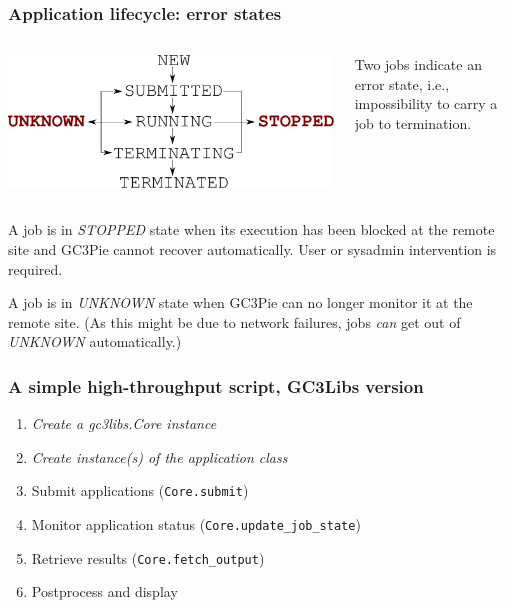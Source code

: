 \documentclass[english,serif,mathserif,xcolor=pdftex,dvipsnames,table]{beamer}
\begin{document}
\begin{frame}[fragile]
\frametitle{Application lifecycle: error states}
\begin{columns}[c]
  \begin{column}{0.5\textwidth}
    \includegraphics[width=\textwidth]{fig/states-error}
  \end{column}
  \begin{column}{0.5\textwidth}
    \raggedleft

    Two jobs indicate an error state, i.e., impossibility to carry a
    job to termination.
  \end{column}
\end{columns}

\+ 
A job is in \emph{STOPPED} state when its execution has been
blocked at the remote site and GC3Pie cannot recover
automatically.  User or sysadmin intervention is required.

\+ 
A job is in \emph{UNKNOWN} state when GC3Pie can no longer
monitor it at the remote site. (As this might be due to network
failures, jobs \emph{can} get out of \emph{UNKNOWN}
automatically.)
\end{frame}


\begin{frame}
\frametitle{A simple high-throughput script, GC3Libs version}

\begin{enumerate}
\item \emph{Create a gc3libs.Core instance}
\item \emph{Create instance(s) of the application class}
\item Submit applications (\texttt{Core.submit})
\item Monitor application status (\texttt{Core.update\_job\_state})
\item Retrieve results (\texttt{Core.fetch\_output})
\item Postprocess and display
\end{enumerate}
\end{frame}
\end{document}
